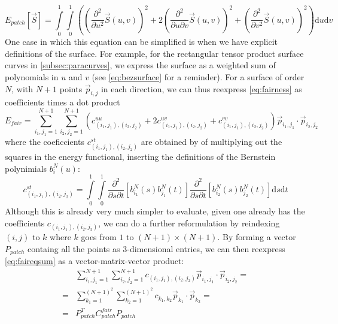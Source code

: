 \begin{equation}
\label{eq:fairness}
E_{patch}\left[\vec{S}\right] = 
\int\limits_0^1 \int\limits_0^1
\left(
\left(
\frac{\partial^2}{\partial u^2 }\vec{S}(u,v)
\right)^2
+ 2 
\left(
\frac{\partial^2}{\partial u\partial v} \vec{S}(u,v)
\right)^2
+
\left(
\frac{\partial^2}{\partial v^2}\vec{S}(u,v)
\right)^2
\right)
\text{d}u\text{d}v
\end{equation}
One case in which this equation can be simplified is when we have explicit definitions of the surface. For example, for the rectangular \Bez tensor product surface curves in \autoref{subsec:paracurves}, we express the surface as a weighted sum of polynomials in $u$ and $v$ (see \autoref{eq:bezsurface} for a reminder). For a \Bez surface of order $N$, with $N+1$ points $\vec{p}_{i,j}$ in each direction, we can thus reexpress \autoref{eq:fairness} as coefficients times a dot product 
\begin{equation}
\label{eq:faireqsum}
E_{fair} =  \sum\limits_{i_1,j_1=1}^{N+1} \sum\limits_{i_2,j_2=1}^{N+1} \left( c_{(i_1,j_1),(i_2,j_2)}^{uu} + 2c_{(i_1,j_1),(i_2,j_2)}^{uv} + c_{(i_1,j_1),(i_2,j_2)}^{vv} \right) \vec{p}_{i_1,j_1} \cdot\vec{p}_{i_2 ,j_2} 
\end{equation} 
where the coeficcients $c_{(i_1,j_1),(i_2,j_2)}^{st}$ are obtained by of multiplying out the squares in the energy functional, inserting the definitions of the Bernstein polynimials $b_{i}^N(u)$:
\begin{equation}
c_{(i_1,j_1),(i_2,j_2)}^{st} = 
\int\limits_0^1 \int\limits_0^1 \frac{\partial^2}{\partial s \partial t} \left[b_{i_1}^N(s) b_{j_1}^N(t)\right]\frac{\partial^2}{\partial s \partial t} \left[ b_{i_2}^N(s) b_{j_2}^N(t)\right]
\text{d}s\text{d}t
\end{equation}
Although this is already very much simpler to evaluate, given one already has the coefficients $c_{(i_1,j_1),(i_2,j_2)}$, we can do a further reformulation by reindexing $(i,j)$ to $k$ where $k$ goes from $1$ to $(N+1)\times(N+1)$. By forming a vector $P_{patch}$ containg all the points as 3-dimensional entries, we can then reexpress \autoref{eq:faireqsum} as a vector-matrix-vector product:
\begin{align*}
\phantom{=}& \sum\limits_{i_1,j_1=1}^{N+1} \sum\limits_{i_2,j_2=1}^{N+1} c_{(i_1,j_1),(i_2,j_2)} \vec{p}_{i_1,j_1} \cdot\vec{p}_{i_2 ,j_2} =
\\
=& \sum\limits_{k_1=1}^{(N+1)^2} \sum\limits_{k_2=1}^{(N+1)^2} c_{k_1,k_2} \vec{p}_{k_1} \cdot\vec{p}_{k_2} =
\\
=& P_{patch}^T C_{patch}^{fair} P_{patch}
\end{align*}
